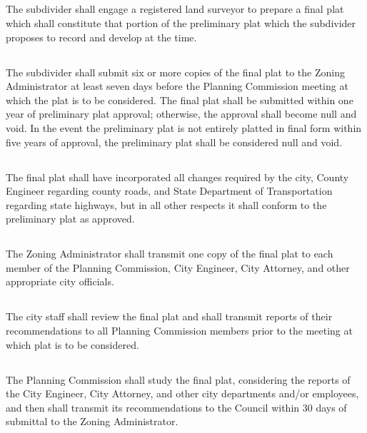 \subsection{}
The subdivider shall engage a registered land surveyor to prepare a final plat which shall constitute that portion of the preliminary plat which the subdivider proposes to record and develop at the time.
\subsection{}
The subdivider shall submit six or more copies of the final plat to the Zoning Administrator at least seven days before the Planning Commission meeting at which the plat is to be considered.  The final plat shall be submitted within one year of preliminary plat approval; otherwise, the approval shall become null and void.  In the event the preliminary plat is not entirely platted in final form within five years of approval, the preliminary plat shall be considered null and void.
\subsection{}
The final plat shall have incorporated all changes required by the city, County Engineer regarding county roads, and State Department of Transportation regarding state highways, but in all other respects it shall conform to the preliminary plat as approved.
\subsection{}
The Zoning Administrator shall transmit one copy of the final plat to each member of the Planning Commission, City Engineer, City Attorney, and other appropriate city officials.
\subsection{}
The city staff shall review the final plat and shall transmit reports of their recommendations to all Planning Commission members prior to the meeting at which plat is to be considered.
\subsection{}
The Planning Commission shall study the final plat, considering the reports of the City Engineer, City Attorney, and other city departments and/or employees, and then shall transmit its recommendations to the Council within 30 days of submittal to the Zoning Administrator.
